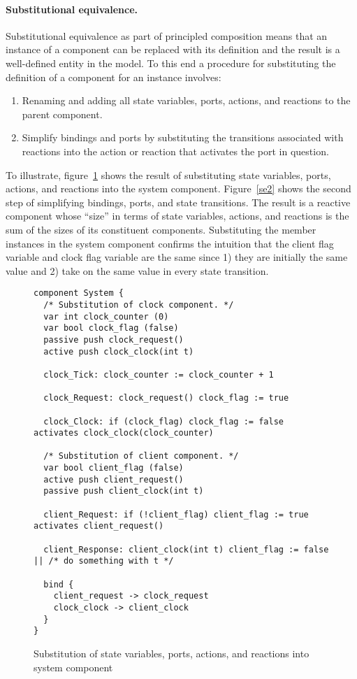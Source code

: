 \paragraph{Substitutional equivalence.}
Substitutional equivalence as part of principled composition means that an instance of a component can be replaced with its definition and the result is a well-defined entity in the model.
To this end a procedure for substituting the definition of a component for an instance involves:
\begin{enumerate}
\item Renaming and adding all state variables, ports, actions, and reactions to the parent component.
\item Simplify bindings and ports by substituting the transitions associated with reactions into the action or reaction that activates the port in question.
\end{enumerate}
To illustrate, figure~\ref{se1} shows the result of substituting state variables, ports, actions, and reactions into the system component.
Figure~\ref{se2} shows the second step of simplifying bindings, ports, and state transitions.
The result is a reactive component whose ``size'' in terms of state variables, actions, and reactions is the sum of the sizes  of its constituent components.
Substituting the member instances in the system component confirms the intuition that the client flag variable and clock flag variable are the same since 1) they are initially the same value and 2) take on the same value in every state transition.

\begin{figure}
\begin{verbatim}
component System {
  /* Substitution of clock component. */
  var int clock_counter (0)
  var bool clock_flag (false)
  passive push clock_request()
  active push clock_clock(int t)

  clock_Tick: clock_counter := clock_counter + 1

  clock_Request: clock_request() clock_flag := true

  clock_Clock: if (clock_flag) clock_flag := false activates clock_clock(clock_counter)

  /* Substitution of client component. */
  var bool client_flag (false)
  active push client_request()
  passive push client_clock(int t)

  client_Request: if (!client_flag) client_flag := true activates client_request()

  client_Response: client_clock(int t) client_flag := false || /* do something with t */

  bind {
    client_request -> clock_request
    clock_clock -> client_clock
  }
}
\end{verbatim}
\caption{Substitution of state variables, ports, actions, and reactions into system component\label{se1}}
\end{figure}

